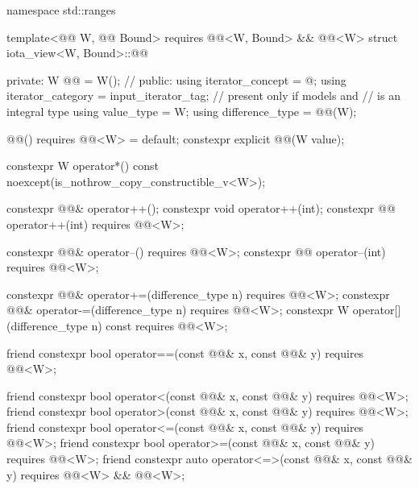 %
\begin{codeblock}
namespace std::ranges {
  template<@@ W, @@ Bound>
    requires @@<W, Bound> && @@<W>
  struct iota_view<W, Bound>::@@ {
  private:
    W @@ = W();             // \expos
  public:
    using iterator_concept = @\seebelow@;
    using iterator_category = input_iterator_tag;       // present only if  models  and
                                                        //  is an integral type
    using value_type = W;
    using difference_type = @@(W);

    @@() requires @@<W> = default;
    constexpr explicit @@(W value);

    constexpr W operator*() const noexcept(is_nothrow_copy_constructible_v<W>);

    constexpr @@& operator++();
    constexpr void operator++(int);
    constexpr @@ operator++(int) requires @@<W>;

    constexpr @@& operator--() requires @@<W>;
    constexpr @@ operator--(int) requires @@<W>;

    constexpr @@& operator+=(difference_type n)
      requires @@<W>;
    constexpr @@& operator-=(difference_type n)
      requires @@<W>;
    constexpr W operator[](difference_type n) const
      requires @@<W>;

    friend constexpr bool operator==(const @@& x, const @@& y)
      requires @@<W>;

    friend constexpr bool operator<(const @@& x, const @@& y)
      requires @@<W>;
    friend constexpr bool operator>(const @@& x, const @@& y)
      requires @@<W>;
    friend constexpr bool operator<=(const @@& x, const @@& y)
      requires @@<W>;
    friend constexpr bool operator>=(const @@& x, const @@& y)
      requires @@<W>;
    friend constexpr auto operator<=>(const @@& x, const @@& y)
      requires @@<W> && @@<W>;

}}
\end{codeblock}
